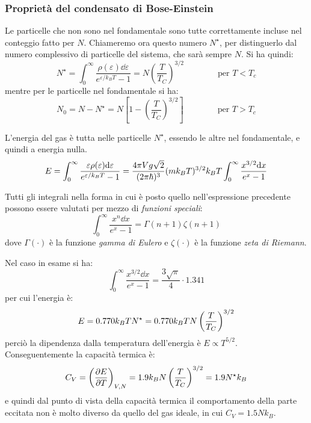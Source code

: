 \subsubsection{Proprietà del condensato di Bose-Einstein}

Le particelle che non sono nel fondamentale sono tutte correttamente incluse nel conteggio fatto per $ N $. Chiameremo ora questo numero $ N^\star $, per distinguerlo dal numero complessivo di particelle del sistema, che sarà sempre $ N $.
Si ha quindi:
\begin{equation*}
N^\star = \int_{0}^{\infty}  \frac{\rho(\varepsilon) \dd \varepsilon}{ e^{\varepsilon/k_B T} - 1} = N \left(\frac{T}{T_C}\right)^{3/2} \qquad \qquad \text{per } T < T_c
\end{equation*}
mentre per le particelle nel fondamentale si ha:
\begin{equation*}
	N_0 = N - N^\star = N \left[1 - \left(\frac{T}{T_C}\right)^{3/2}\right] \qquad \qquad \text{per } T > T_c
\end{equation*}

L'energia del gas è tutta nelle particelle $ N^\star $, essendo le altre nel fondamentale, e quindi a energia nulla.
\begin{equation*}
	E = \int_{0}^{\infty}  \frac{\varepsilon \rho(\varepsilon) \dd \varepsilon}{ e^{\varepsilon/k_B T} - 1} = \frac{4\pi V g \sqrt{2} }{(2\pi \hbar)^3} (mk_B T)^{3/2} k_B T \int_{0}^{\infty}  \frac{x^{3/2} \dd x}{ e^x - 1}
\end{equation*}

\begin{note}
	Tutti gli integrali nella forma in cui è posto quello nell'espressione precedente possono essere valutati per mezzo di \textit{funzioni speciali}:
	\begin{equation*}
		\int_{0}^{\infty}  \frac{x^n \dd x}{ e^x - 1} = \Gamma(n+1) \zeta(n+1)
	\end{equation*}
	dove $ \Gamma(\cdot) $ è la funzione \textit{gamma di Eulero} e $ \zeta(\cdot) $ è la funzione \textit{zeta di Riemann}.
\end{note}

Nel caso in esame si ha:
\begin{equation*}
	\int_{0}^{\infty}  \frac{x^{3/2} \dd x}{ e^x - 1} = \frac{3\sqrt{\pi}}{4} \cdot 1.341
\end{equation*}
per cui l'energia è:
\begin{equation*}
	E = 0.770 k_B T N^{\star} = 0.770 k_B T N  \left(\frac{T}{T_C}\right)^{3/2}
\end{equation*}
perciò la dipendenza dalla temperatura dell'energia è $ E \propto T^{5/2} $. Conseguentemente la capacità termica è:
\begin{equation*}
	C_V = \left(\frac{\partial {E}}{\partial {T}}\right)_{V,N} = 1.9 k_B N  \left(\frac{T}{T_C}\right)^{3/2} = 1.9 N^\star k_B 
\end{equation*}
e quindi dal punto di vista della capacità termica il comportamento della parte eccitata non è molto diverso da quello del gas ideale, in cui $C_V = 1.5 N k_B$.

